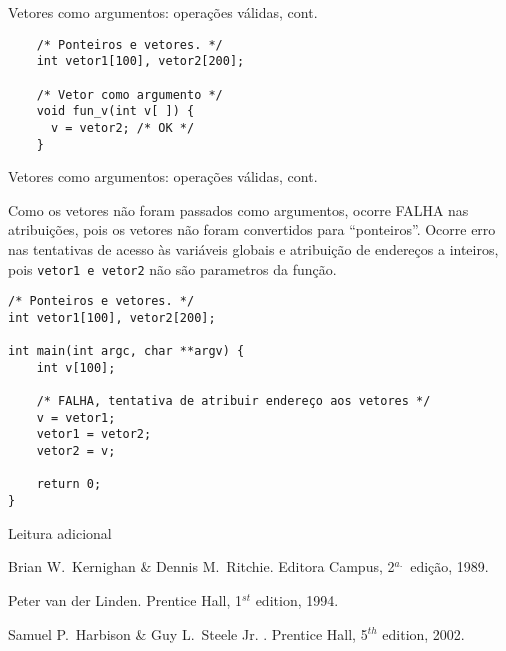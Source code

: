 \begin{frame}[fragile]{Vetores como argumentos: operações válidas, cont.}
  \begin{lstlisting}
    /* Ponteiros e vetores. */
    int vetor1[100], vetor2[200];

    /* Vetor como argumento */
    void fun_v(int v[ ]) {
      v = vetor2; /* OK */
    }
 \end{lstlisting}
\end{frame}

\begin{frame}[fragile]{Vetores como argumentos: operações válidas, cont.}

  {\scriptsize Como os vetores não foram passados como argumentos,
    ocorre \alert{FALHA} nas atribuições, pois os vetores não foram
    convertidos para ``ponteiros''. Ocorre erro nas tentativas de
    acesso às variáveis globais e atribuição de endereços a inteiros, pois
    {\tt vetor1 e vetor2} não são parametros da função.}
\begin{lstlisting}
/* Ponteiros e vetores. */
int vetor1[100], vetor2[200];

int main(int argc, char **argv) {
    int v[100];

    /* FALHA, tentativa de atribuir endereço aos vetores */
    v = vetor1;
    vetor1 = vetor2; 
    vetor2 = v;

    return 0;
}
\end{lstlisting}

\end{frame}

\begin{frame}{Leitura adicional}

\begin{thebibliography}{5}
    Brian W.\ Kernighan \& Dennis M.\ Ritchie.
    \newblock Editora Campus, 2$^{a.}$\ edição, 1989.

     Peter van der Linden.
     \newblock Prentice Hall, 1$^{st}$ edition, 1994.

        Samuel P.\ Harbison \& Guy L.\ Steele Jr.
        .
        \newblock Prentice Hall, 5$^{th}$ edition, 2002.
\end{thebibliography}

\end{frame}
